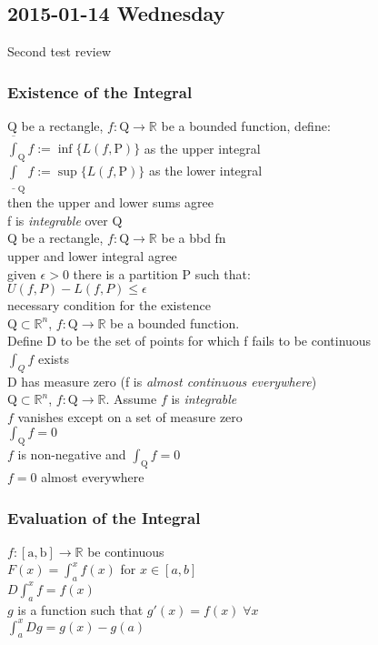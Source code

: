 
\subsection{2015-01-14 Wednesday}
Second test review
\subsubsection{Existence of the Integral}
\LET Q be a rectangle, $f:\mathrm{Q}\to\mathbb{R}$ be a bounded function, define:\\
$\overline{\int}_{\mathrm{Q}} f := \inf\{L(f, \mathrm{P})\}$ as the upper integral\\
$\underline{\int}_{\mathrm{Q}} f := \sup\{L(f, \mathrm{P})\}$ as the lower integral\\
\IF then the upper and lower sums agree\\
\THEN f is \textit{integrable} over Q\\

\LET Q be a rectangle, $f:\mathrm{Q}\to\mathbb{R}$ be a bbd fn\\
\THEN upper and lower integral agree\\
\IFF given $\epsilon>0$ there is a partition P such that:\\
$U(f,P) - L(f,P)\leq\epsilon$\\
\IDEA necessary condition for the existence\\

\LET $\mathrm{Q}\subset\mathbb{R}^n$, $f:\mathrm{Q}\to\mathbb{R}$ be a bounded function.\\
Define D to be the set of points for which f fails to be continuous\\
\THEN $\int_{Q} f$ exists\\
\IFF D has measure zero (f is \textit{almost continuous everywhere})\\

\LET $\mathrm{Q}\subset\mathbb{R}^n$, 
$f:\mathrm{Q}\to\mathbb{R}$.
Assume $f$ is \textit{integrable}\\
\IF $f$ vanishes except on a set of measure zero\\
\THEN $\int_{\mathrm{Q}}f = 0$\\
\IF $f$ is non-negative and $\int_{\mathrm{Q}}f = 0$\\
\THEN $f=0$ almost everywhere

\subsubsection{Evaluation of the Integral}
\LET $f:\mathrm{[a,b]}\to\mathbb{R}$ be continuous\\
\IF $F(x)=\int_a^xf(x)$ for $x\in[a,b]$\\
\THEN $D\int_a^xf=f(x)$\\
\IF $g$ is a function such that $g'(x)=f(x)\;\forall x$\\
\THEN $\int_a^x Dg = g(x)-g(a)$\\

